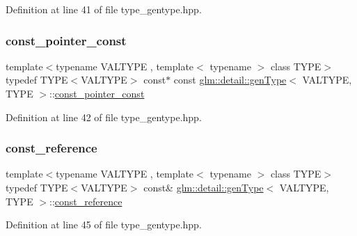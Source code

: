 Definition at line 41 of file type\+\_\+gentype.\+hpp.

\mbox{\label{structglm_1_1detail_1_1gen_type_a4f3f1bc18abdbdba5757fc63052157fa}} 
\subsubsection{\texorpdfstring{const\_pointer\_const}{const\_pointer\_const}}
{\footnotesize\ttfamily template$<$typename V\+A\+L\+T\+Y\+PE , template$<$ typename $>$ class T\+Y\+PE$>$ \\
typedef T\+Y\+PE$<$V\+A\+L\+T\+Y\+PE$>$ const$\ast$ const \mbox{\hyperlink{structglm_1_1detail_1_1gen_type}{glm\+::detail\+::gen\+Type}}$<$ V\+A\+L\+T\+Y\+PE, T\+Y\+PE $>$\+::\mbox{\hyperlink{structglm_1_1detail_1_1gen_type_a4f3f1bc18abdbdba5757fc63052157fa}{const\+\_\+pointer\+\_\+const}}}



Definition at line 42 of file type\+\_\+gentype.\+hpp.

\mbox{\label{structglm_1_1detail_1_1gen_type_a509ca374a85f8a9ea319bc5a980d5f1a}} 
\subsubsection{\texorpdfstring{const\_reference}{const\_reference}}
{\footnotesize\ttfamily template$<$typename V\+A\+L\+T\+Y\+PE , template$<$ typename $>$ class T\+Y\+PE$>$ \\
typedef T\+Y\+PE$<$V\+A\+L\+T\+Y\+PE$>$ const\& \mbox{\hyperlink{structglm_1_1detail_1_1gen_type}{glm\+::detail\+::gen\+Type}}$<$ V\+A\+L\+T\+Y\+PE, T\+Y\+PE $>$\+::\mbox{\hyperlink{structglm_1_1detail_1_1gen_type_a509ca374a85f8a9ea319bc5a980d5f1a}{const\+\_\+reference}}}



Definition at line 45 of file type\+\_\+gentype.\+hpp.

